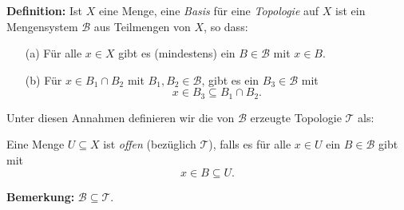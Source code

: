 \documentclass[fleqn, 12pt, letterpaper]{article}
\begin{document}
\textbf{Definition:}  
Ist \( X \) eine Menge, eine \emph{Basis} für eine \emph{Topologie} auf \( X \) ist ein Mengensystem \( \mathcal{B} \) aus Teilmengen von \( X \), so dass:
\begin{enumerate}
  \item[(a)] Für alle \( x \in X \) gibt es (mindestens) ein \( B \in \mathcal{B} \) mit \( x \in B \).
  \item[(b)] Für \( x \in B_1 \cap B_2 \) mit \( B_1, B_2 \in \mathcal{B} \), gibt es ein \( B_3 \in \mathcal{B} \) mit  
  \[
    x \in B_3 \subseteq B_1 \cap B_2.
  \]
\end{enumerate}

{Unter diesen Annahmen definieren wir die von \( \mathcal{B} \) erzeugte Topologie \( \mathcal{T} \) als:}  

Eine Menge \( U \subseteq X \) ist \emph{offen} (bezüglich \( \mathcal{T} \)), falls es für alle \( x \in U \) ein \( B \in \mathcal{B} \) gibt mit  
\[
x \in B \subseteq U.
\]

\textbf{Bemerkung:} \( \mathcal{B} \subseteq \mathcal{T} \).
\end{document}

